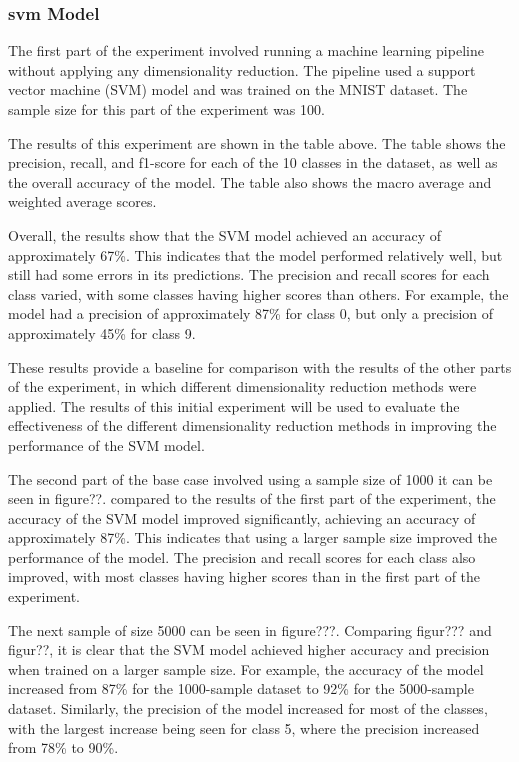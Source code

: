 \subsubsection{svm Model}\label{subsubsec:experiment_4_no_dimmensionality_reduction}

The first part of the experiment involved running a machine learning pipeline without applying any dimensionality reduction. The pipeline used a support vector machine (SVM) model and was trained on the MNIST dataset. The sample size for this part of the experiment was 100.

The results of this experiment are shown in the table above. The table shows the precision, recall, and f1-score for each of the 10 classes in the dataset, as well as the overall accuracy of the model. The table also shows the macro average and weighted average scores.

Overall, the results show that the SVM model achieved an accuracy of approximately 67\%. This indicates that the model performed relatively well, but still had some errors in its predictions. The precision and recall scores for each class varied, with some classes having higher scores than others. For example, the model had a precision of approximately 87\% for class 0, but only a precision of approximately 45\% for class 9.

These results provide a baseline for comparison with the results of the other parts of the experiment, in which different dimensionality reduction methods were applied. The results of this initial experiment will be used to evaluate the effectiveness of the different dimensionality reduction methods in improving the performance of the SVM model.

The second part of the base case involved using a sample size of 1000 it can be seen in figure??. compared to the results of the first part of the experiment, the accuracy of the SVM model improved significantly, achieving an accuracy of approximately 87\%. This indicates that using a larger sample size improved the performance of the model. The precision and recall scores for each class also improved, with most classes having higher scores than in the first part of the experiment.

The next sample of size 5000 can be seen in figure???.
Comparing figur??? and figur??, it is clear that the SVM model achieved higher accuracy and precision when trained on a larger sample size. For example, the accuracy of the model increased from 87\% for the 1000-sample dataset to 92\% for the 5000-sample dataset. Similarly, the precision of the model increased for most of the classes, with the largest increase being seen for class 5, where the precision increased from 78\% to 90\%.

